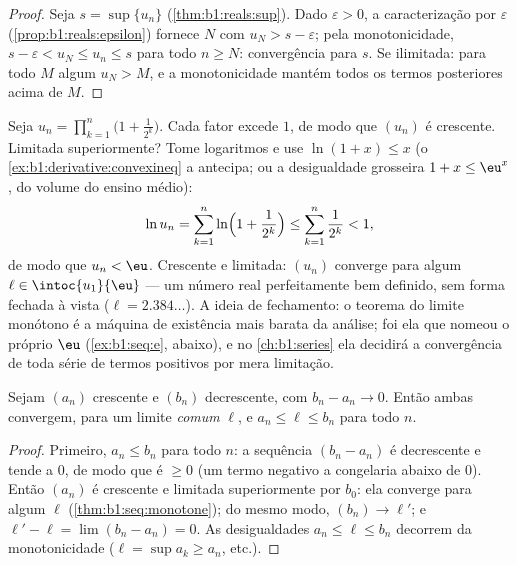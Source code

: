 \begin{proof}
Seja $s = \sup\{u_n\}$ (\cref{thm:b1:reals:sup}). Dado $\varepsilon >
0$, a caracterização por $\varepsilon$
(\cref{prop:b1:reals:epsilon}) fornece $N$ com $u_N > s -
\varepsilon$; pela monotonicidade, $s - \varepsilon < u_N \leq u_n \leq
s$ para todo $n \geq N$: convergência para $s$. Se ilimitada: para todo
$M$ algum $u_N > M$, e a monotonicidade mantém todos os termos
posteriores acima de $M$.
\end{proof}

\begin{example}\label{ex:b1:seq:existencemachine}
Seja $u_n = \prod_{k=1}^{n} \bigl(1 + \frac{1}{2^k}\bigr)$. Cada
fator excede $1$, de modo que $(u_n)$ é crescente. Limitada
superiormente? Tome logaritmos e use $\ln(1 + x) \leq x$
(o \cref{ex:b1:derivative:convexineq} a antecipa; ou a desigualdade
grosseira $1 + x \leq \eu^x$, do volume do ensino médio):
\[
\ln u_n = \sum_{k=1}^{n} \ln\Bigl(1 + \frac{1}{2^k}\Bigr)
\leq \sum_{k=1}^{n} \frac{1}{2^k} < 1 ,
\]
de modo que $u_n < \eu$. Crescente e limitada: $(u_n)$ converge para algum
$\ell \in \intoc{u_1}{\eu}$ --- um número real perfeitamente bem definido, sem
forma fechada à vista ($\ell = 2.384\dots$). A ideia de
fechamento: o teorema do limite monótono é a máquina de existência mais
barata da análise; foi ela que nomeou o próprio $\eu$
(\cref{ex:b1:seq:e}, abaixo), e no \cref{ch:b1:series} ela decidirá
a convergência de toda série de termos positivos por mera
limitação.
\end{example}

\begin{theorem}\label{thm:b1:seq:adjacent}
Sejam $(a_n)$ crescente e $(b_n)$ decrescente, com $b_n - a_n \to
0$. Então ambas convergem, para um limite \emph{comum} $\ell$, e $a_n
\leq \ell \leq b_n$ para todo $n$.
\end{theorem}

\begin{proof}
Primeiro, $a_n \leq b_n$ para todo $n$: a sequência $(b_n - a_n)$ é
decrescente e tende a $0$, de modo que é $\geq 0$ (um termo negativo a
congelaria abaixo de $0$). Então $(a_n)$ é crescente e limitada
superiormente por $b_0$: ela converge para algum $\ell$
(\cref{thm:b1:seq:monotone}); do mesmo modo, $(b_n) \to \ell'$; e $\ell' - \ell = \lim (b_n - a_n) =
0$. As desigualdades $a_n \leq \ell \leq b_n$ decorrem da
monotonicidade ($\ell = \sup a_k \geq a_n$, etc.).
\end{proof}

